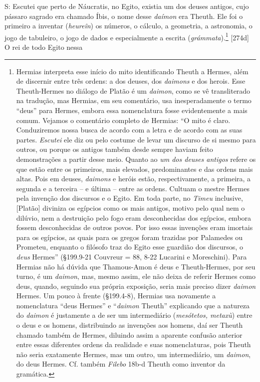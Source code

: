 S: Escutei que perto de Náucratis, no Egito, existia um dos deuses
antigos, cujo pássaro sagrado era chamado Íbis, o nome desse
\emph{daímon} era Theuth. Ele foi o primeiro a inventar (\emph{heureîn})
os números, o cálculo, a geometria, a astronomia, o jogo de tabuleiro, o
jogo de dados e especialmente a escrita (\emph{grámmata}).\footnote{Hermias
  interpreta esse início do mito identificando Theuth a Hermes, além de
  discernir entre três ordens: a dos deuses, dos \emph{daimons} e dos
  herois. Esse Theuth-Hermes no diálogo de Platão é um \emph{daimon},
  como se vê transliterado na tradução, mas Hermias, em seu comentário,
  usa inesperadamente o termo ``deus'' para Hermes, embora essa
  nomenclatura fosse evidentemente a mais comum. Vejamos o comentário
  completo de Hermias: ``O mito é claro. Conduziremos nossa busca de
  acordo com a letra e de acordo com as suas partes. \emph{Escutei} ele
  diz ou pelo costume de levar um discurso de si mesmo para outros, ou
  porque os antigos também desde sempre haviam feito demonstrações a
  partir desse meio. Quanto ao \emph{um dos deuses antigos} refere os
  que estão entre os primeiros, mais elevados, predominantes e das
  ordens mais altas. Pois em deuses, \emph{daimons} e heróis estão,
  respectivamente, a primeira, a segunda e a terceira -- e última --
  entre as ordens. Cultuam o mestre Hermes pela invenção dos discursos e
  o Egito. Em toda parte, no \emph{Timeu} inclusive, {[}Platão{]}
  diviniza os egípcios como os mais antigos, motivo pelo qual nem o
  dilúvio, nem a destruição pelo fogo eram desconhecidas dos egípcios,
  embora fossem desconhecidas de outros povos. Por isso essas invenções
  eram imortais para os egípcios, as quais para os gregos foram trazidas
  por Palamedes ou Prometeu, enquanto o filósofo traz do Egito esse
  guardião dos discursos, o \emph{deus} Hermes'' (§199.9-21 Couvreur =
  88, 8-22 Lucarini e Moreschini). Para Hermias não há dúvida que
  Thamous-Amon é deus e Theuth-Hermes, por seu turno, é um
  \emph{daimon}, mas, mesmo assim, ele não deixa de referir Hermes como
  deus, quando, seguindo sua própria exposição, seria mais preciso dizer
  \emph{daimon} Hermes. Um pouco à frente (§199.4-8), Hermias usa
  novamente a nomenclatura ``deus Hermes'' e ``\emph{daimon} Theuth''
  explicando que a natureza do \emph{daimon} é justamente a de ser um
  intermediário (\emph{mesótetos, metaxù}) entre o deus e os homens,
  distribuindo as invenções aos homens, daí ser Theuth chamado também de
  Hermes, diluindo assim a aparente confusão anterior entre essas
  diferentes ordens da realidade e suas nomenclaturas, pois Theuth não
  seria exatamente Hermes, mas um outro, um intermediário, um
  \emph{daimon}, do deus Hermes. Cf. também \emph{Filebo} 18b-d Theuth
  como inventor da gramática.} {[}274d{]} O rei de todo Egito nessa
